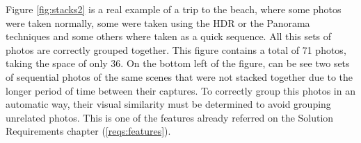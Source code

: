 Figure \ref{fig:stacks2} is a real example of a trip to the beach, where some photos were taken normally, some were taken using the \ac{HDR} or the Panorama techniques and some others where taken as a quick sequence. All this sets of photos are correctly grouped together. This figure contains a total of 71 photos, taking the space of only 36.  On the bottom left of the figure, can be see two sets of sequential photos of the same scenes that were not stacked together due to the longer period of time between their captures. To correctly group this photos in an automatic way, their visual similarity must be determined to avoid grouping unrelated photos. This is one of the features already referred on the Solution Requirements chapter (\ref{reqs:features}). 


